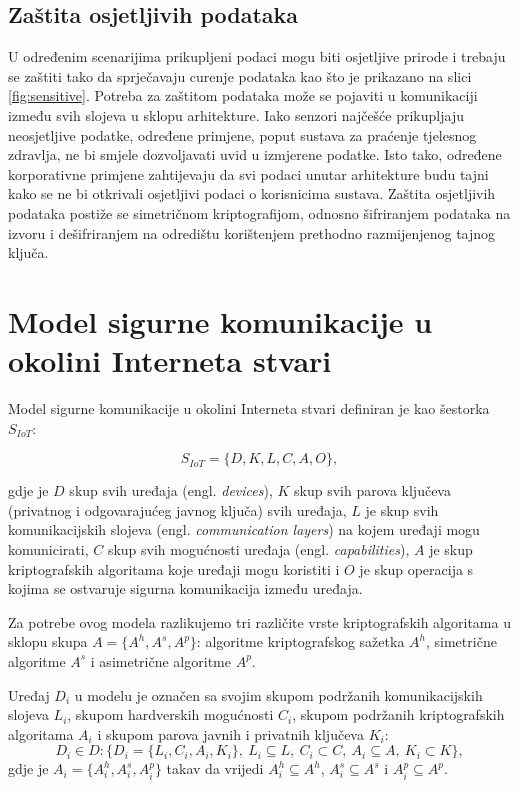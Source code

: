 \subsection{Zaštita osjetljivih podataka}
U određenim scenarijima prikupljeni podaci mogu biti osjetljive prirode i
trebaju se zaštiti tako da sprječavaju curenje podataka kao što je prikazano
na slici \ref{fig:sensitive}. Potreba za zaštitom podataka može se pojaviti u
komunikaciji između svih slojeva u sklopu arhitekture. Iako senzori najčešće
prikupljaju neosjetljive podatke, određene primjene, poput sustava za
praćenje tjelesnog zdravlja, ne bi smjele dozvoljavati uvid u izmjerene podatke.
Isto tako, određene korporativne primjene zahtijevaju da svi podaci unutar
arhitekture budu tajni kako se ne bi otkrivali osjetljivi podaci o korisnicima
sustava. Zaštita osjetljivih podataka postiže se simetričnom kriptografijom,
odnosno šifriranjem podataka na izvoru i dešifriranjem na odredištu korištenjem
prethodno razmijenjenog tajnog ključa.

\section{Model sigurne komunikacije u okolini Interneta stvari}

Model sigurne komunikacije u okolini Interneta stvari definiran je kao šestorka
$S_{IoT}$:

\begin{equation}
    S_{IoT}=\{D,K,L,C,A,O\},
\end{equation}

gdje je $D$ skup svih uređaja (engl. \emph{devices}), $K$ skup svih parova
ključeva (privatnog i odgovarajućeg javnog ključa)
svih uređaja, $L$ je skup svih komunikacijskih slojeva (engl.
\emph{communication layers}) na kojem uređaji mogu komunicirati, $C$ skup svih
mogućnosti uređaja (engl. \emph{capabilities}), $A$ je skup kriptografskih
algoritama koje uređaji mogu koristiti i $O$ je skup operacija
s kojima se ostvaruje sigurna komunikacija između uređaja.

Za potrebe ovog modela razlikujemo tri različite vrste kriptografskih
algoritama u sklopu skupa $A=\{A^h,A^s,A^p\}$: algoritme kriptografskog sažetka
$A^h$, simetrične algoritme $A^s$ i asimetrične algoritme $A^p$.

Uređaj $D_i$ u modelu je označen sa svojim skupom podržanih
komunikacijskih slojeva $L_i$, skupom hardverskih mogućnosti $C_i$, skupom
podržanih kriptografskih algoritama $A_i$ i skupom parova javnih i privatnih
ključeva $K_i$:
\begin{equation}
    D_i \in D:\{D_i=\{L_i,C_i,A_i,K_i\},\ L_i \subseteq L,\ C_i \subset C,\ A_i 
    \subseteq A,\ K_i \subset K\},
\end{equation}
gdje je $A_i=\{A^h_i,A^s_i,A^p_i\}$ takav da vrijedi $A^h_i\subseteq A^h$,
$A^s_i\subseteq A^s$ i $A^p_i\subseteq A^p$.

